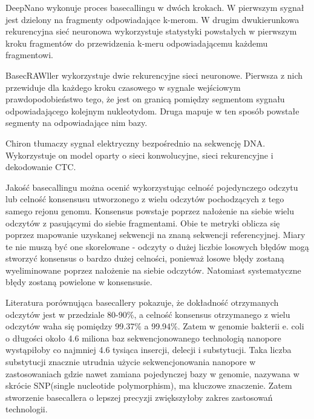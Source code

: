 \documentclass[a4paper,11pt,twoside]{report}
\theoremstyle{definition}
\begin{document}
DeepNano\cite{deepNano} wykonuje proces basecallingu w dwóch krokach. W pierwszym sygnał jest dzielony na fragmenty odpowiadające k-merom. W drugim dwukierunkowa rekurencyjna sieć neuronowa wykorzystuje statystyki powstałych w pierwszym kroku fragmentów do przewidzenia k-meru odpowiadającemu każdemu fragmentowi. 

BasecRAWller\cite{basecrawler} wykorzystuje dwie rekurencyjne sieci neuronowe. Pierwsza z nich przewiduje dla każdego kroku czasowego w sygnale wejściowym prawdopodobieństwo tego, że jest on granicą pomiędzy segmentom sygnału odpowiadającego kolejnym nukleotydom. Druga mapuje w ten sposób powstałe segmenty na odpowiadające nim bazy.

Chiron\cite{chiron} tłumaczy sygnał elektryczny bezpośrednio na sekwencję DNA. Wykorzystuje on model oparty o sieci konwolucyjne, sieci rekurencyjne i dekodowanie CTC.

Jakość basecallingu można ocenić wykorzystując celność pojedynczego odczytu lub celność konsensusu utworzonego z wielu odczytów pochodzących z tego samego rejonu genomu. Konsensus powstaje poprzez nałożenie na siebie wielu odczytów z pasującymi do siebie fragmentami. Obie te metryki oblicza się poprzez mapowanie uzyskanej sekwencji na znaną sekwencji referencyjnej. Miary te nie muszą być one skorelowane - odczyty o dużej liczbie losowych błędów mogą stworzyć konsensus o bardzo dużej celności, ponieważ losowe błędy zostaną wyeliminowane poprzez nałożenie na siebie odczytów. Natomiast systematyczne błędy zostaną powielone w konsensusie\cite{wick}.

Literatura porównująca basecallery pokazuje, że dokładność otrzymanych odczytów jest w przedziale 80-90\%, a celność konsensus otrzymanego z wielu odczytów waha się pomiędzy 99.37\% a 99.94\%\cite{wick}. Zatem w genomie bakterii e. coli o długości około 4.6 miliona baz sekwencjonowanego technologią nanopore wystąpiłoby co najmniej 4.6 tysiąca insercji, delecji i substytucji. Taka liczba substytucji znacznie utrudnia użycie sekwencjonowania nanopore w zastosowaniach gdzie nawet zamiana pojedynczej bazy w genomie, nazywana w skrócie SNP(single nucleotide polymorphism), ma kluczowe znaczenie\cite{snp}. Zatem stworzenie basecallera o lepszej precyzji zwiększyłoby zakres zastosowań technologii.
\end{document}
